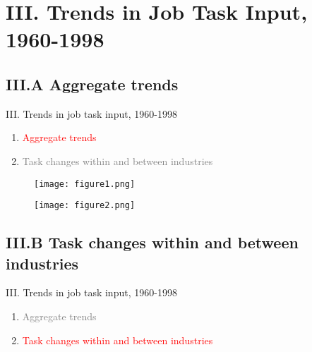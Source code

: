\documentclass[notes=show]{beamer}
\begin{document}
\section{III. Trends in Job Task Input, 1960-1998}

\subsection{III.A Aggregate trends}

\begin{frame}{III. Trends in job task input, 1960-1998}
\begin{enumerate}
\item[\textcolor{red}{III.A}]  \textcolor{red}{Aggregate trends} \bigskip
\item[\textcolor{gray}{III.B}]  \textcolor{gray}{Task changes within and between industries} \bigskip
\end{enumerate}
\end{frame}

\newpage
\begin{center}
\begin{figure}
\texttt{[image: figure1.png]}
\end{figure} 
\end{center}
\newpage

\newpage
\begin{center}
\begin{figure}
\texttt{[image: figure2.png]}
\end{figure} 
\end{center}
\newpage

\subsection{III.B Task changes within and between industries}

\begin{frame}{III. Trends in job task input, 1960-1998}
\begin{enumerate}
\item[\textcolor{gray}{III.A}]  \textcolor{gray}{Aggregate trends} \bigskip
\item[\textcolor{red}{III.B}]  \textcolor{red}{Task changes within and between industries} \bigskip
\end{enumerate}
\end{frame}
\end{document}

